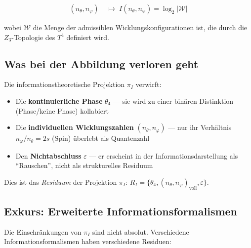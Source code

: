 \begin{align}
  (n_\theta, n_\varphi) &\;\longmapsto\; I(n_\theta, n_\varphi)
  = \log_2 |\mathcal{W}| \tag{243.3}
\end{align}

wobei $\mathcal{W}$ die Menge der admissiblen Wicklungskonfigurationen
ist, die durch die $Z_3$-Topologie des $T^4$ definiert wird.

\subsection{Was bei der Abbildung verloren geht}

Die informationstheoretische Projektion $\pi_I$ verwirft:

\begin{itemize}
  \item Die \textbf{kontinuierliche Phase} $\theta_4$ --- sie wird
        zu einer binären Distinktion (Phase/keine Phase) kollabiert
  \item Die \textbf{individuellen Wicklungszahlen} $(n_\theta, n_\varphi)$
        --- nur ihr Verhältnis $n_\varphi / n_\theta = 2s$ (Spin)
        überlebt als Quantenzahl
  \item Den \textbf{Nichtabschluss} $\varepsilon$ --- er erscheint
        in der Informationsdarstellung als ``Rauschen'', nicht als
        strukturelles Residuum
\end{itemize}

Dies ist das \emph{Residuum} der Projektion $\pi_I$:
$R_I = \{\theta_4, (n_\theta, n_\varphi)_\text{voll}, \varepsilon\}$.


\subsection{Exkurs: Erweiterte Informationsformalismen}

Die Einschränkungen von $\pi_I$ sind nicht absolut. Verschiedene
Informationsformalismen haben verschiedene Residuen:


